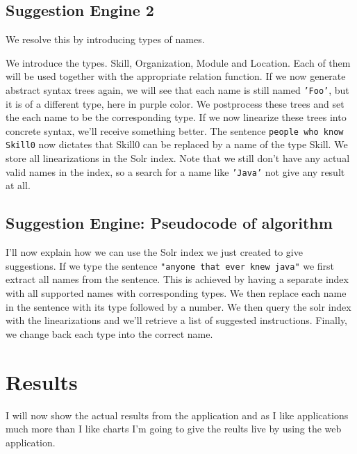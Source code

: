 \documentclass[
10pt, %
a4paper, %
oneside, %
headinclude,footinclude, %
BCOR5mm, %
]{scrartcl}
\begin{document}
\subsection{Suggestion Engine 2}
We resolve this by introducing types of names.

We introduce the types. Skill, Organization, Module and Location. Each of them will be used together with the appropriate relation function.
\newline
\newline
If we now generate abstract syntax trees again, we will see that each name is still named \texttt{'Foo'}, but it is of a different type, here in purple color.
\newline
\newline
We postprocess these trees and set the each name to be the corresponding type.
\newline
\newline
If we now linearize these trees into concrete syntax, we'll receive something better. The sentence \texttt{people who know Skill0} now dictates that Skill0 can be replaced by a name of the type Skill. We store all linearizations in the Solr index. Note that we still don't have any actual valid names in the index, so a search for a name like \texttt{'Java'} not give any result at all. 

\subsection{Suggestion Engine: Pseudocode of algorithm}
I'll now explain how we can use the Solr index we just created to give suggestions.
\newline
\newline
If we type the sentence \texttt{"anyone that ever knew java"} we first extract all names from the sentence. This is achieved by having a separate index with all supported names with corresponding types.
\newline
\newline
We then replace each name in the sentence with its type followed by a number.
\newline
\newline
We then query the solr index with the linearizations and we'll retrieve a list of suggested instructions.
\newline
\newline
Finally, we change back each type into the correct name.

\section{Results}
I will now show the actual results from the application and as I like applications much more than I like charts
\newline
\newline
I'm going to give the reults live by using the web application.
\end{document}
